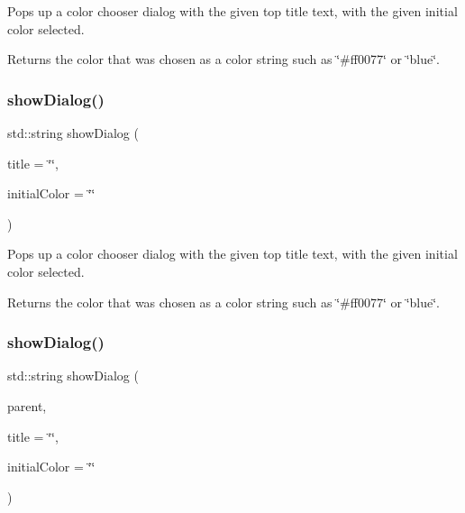 Pops up a color chooser dialog with the given top title text, with the given initial color selected. 

Returns the color that was chosen as a color string such as \char`\"{}\#ff0077\char`\"{} or \char`\"{}blue\char`\"{}. \mbox{\label{classsgl_1_1GColorChooser_ab649c9d45542c25fa22096c5afa831e7}} 
\subsubsection{\texorpdfstring{show\+Dialog()}{showDialog()}\hspace{0.1cm}{\footnotesize\ttfamily [4/6]}}
{\footnotesize\ttfamily std\+::string show\+Dialog (\begin{DoxyParamCaption}\item[{const std\+::string \&}]{title = {\ttfamily \char`\"{}\char`\"{}},  }\item[{const std\+::string \&}]{initial\+Color = {\ttfamily \char`\"{}\char`\"{}} }\end{DoxyParamCaption})\hspace{0.3cm}{\ttfamily [static]}}



Pops up a color chooser dialog with the given top title text, with the given initial color selected. 

Returns the color that was chosen as a color string such as \char`\"{}\#ff0077\char`\"{} or \char`\"{}blue\char`\"{}. \mbox{\label{classsgl_1_1GColorChooser_a38b9e47e162e84e985c38c7a8ab69278}} 
\subsubsection{\texorpdfstring{show\+Dialog()}{showDialog()}\hspace{0.1cm}{\footnotesize\ttfamily [5/6]}}
{\footnotesize\ttfamily std\+::string show\+Dialog (\begin{DoxyParamCaption}\item[{\mbox{\hyperlink{classsgl_1_1GWindow}{G\+Window}} $\ast$}]{parent,  }\item[{const std\+::string \&}]{title = {\ttfamily \char`\"{}\char`\"{}},  }\item[{const std\+::string \&}]{initial\+Color = {\ttfamily \char`\"{}\char`\"{}} }\end{DoxyParamCaption})\hspace{0.3cm}{\ttfamily [static]}}



